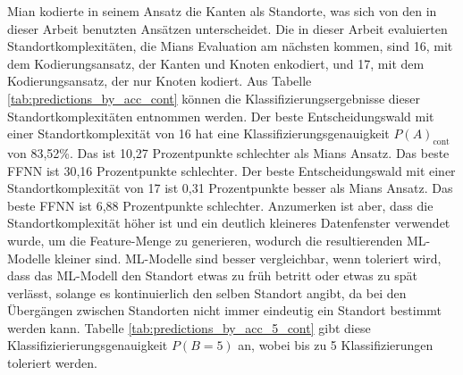 \newline
\newline
Mian kodierte in seinem Ansatz die Kanten als Standorte, was sich von den in dieser Arbeit benutzten Ansätzen unterscheidet.
Die in dieser Arbeit evaluierten Standortkomplexitäten, die Mians Evaluation am nächsten kommen, sind 16, mit dem Kodierungsansatz, der Kanten und Knoten enkodiert,
und 17, mit dem Kodierungsansatz, der nur Knoten kodiert.
\newline
\newline
Aus Tabelle \ref{tab:predictions_by_acc_cont} können die Klassifizierungsergebnisse dieser Standortkomplexitäten entnommen werden.
Der beste Entscheidungswald mit einer Standortkomplexität von 16 hat eine Klassifizierungsgenauigkeit $P(A)_{\text{cont}}$ von 83,52\%.
Das ist 10,27 Prozentpunkte schlechter als Mians Ansatz.
Das beste FFNN ist 30,16 Prozentpunkte schlechter.
Der beste Entscheidungswald mit einer Standortkomplexität von 17 ist 0,31 Prozentpunkte besser als Mians Ansatz.
Das beste FFNN ist 6,88 Prozentpunkte schlechter.
Anzumerken ist aber, dass die Standortkomplexität höher ist und ein deutlich kleineres Datenfenster verwendet wurde,
um die Feature-Menge zu generieren, wodurch die resultierenden ML-Modelle kleiner sind.
\newline
\newline
ML-Modelle sind besser vergleichbar, wenn toleriert wird, dass das ML-Modell den Standort etwas zu früh betritt oder etwas zu spät verlässt,
solange es kontinuierlich den selben Standort angibt, da bei den Übergängen zwischen Standorten nicht immer eindeutig ein Standort bestimmt werden kann.
Tabelle \ref{tab:predictions_by_acc_5_cont} gibt diese Klassifizierierungsgenauigkeit $P(B=5)$ an, wobei bis zu 5 Klassifizierungen toleriert werden.
